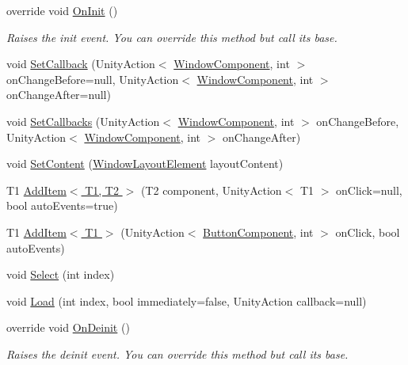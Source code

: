 \begin{DoxyCompactItemize}
\item 
override void \hyperlink{class_unity_engine_1_1_u_i_1_1_windows_1_1_components_1_1_tabs_a09878546b509e7b25a479278f45f5b26}{On\+Init} ()
\begin{DoxyCompactList}\small\item\em Raises the init event. You can override this method but call it\textquotesingle{}s base. \end{DoxyCompactList}\item 
void \hyperlink{class_unity_engine_1_1_u_i_1_1_windows_1_1_components_1_1_tabs_a8402abf2188439aa7919a1f2645fce62}{Set\+Callback} (Unity\+Action$<$ \hyperlink{class_unity_engine_1_1_u_i_1_1_windows_1_1_window_component}{Window\+Component}, int $>$ on\+Change\+Before=null, Unity\+Action$<$ \hyperlink{class_unity_engine_1_1_u_i_1_1_windows_1_1_window_component}{Window\+Component}, int $>$ on\+Change\+After=null)
\item 
void \hyperlink{class_unity_engine_1_1_u_i_1_1_windows_1_1_components_1_1_tabs_a39db1c47ef456cab544eca9007e92973}{Set\+Callbacks} (Unity\+Action$<$ \hyperlink{class_unity_engine_1_1_u_i_1_1_windows_1_1_window_component}{Window\+Component}, int $>$ on\+Change\+Before, Unity\+Action$<$ \hyperlink{class_unity_engine_1_1_u_i_1_1_windows_1_1_window_component}{Window\+Component}, int $>$ on\+Change\+After)
\item 
void \hyperlink{class_unity_engine_1_1_u_i_1_1_windows_1_1_components_1_1_tabs_a76036c768aaaa23bf3e0a929f564b8fb}{Set\+Content} (\hyperlink{class_unity_engine_1_1_u_i_1_1_windows_1_1_window_layout_element}{Window\+Layout\+Element} layout\+Content)
\item 
T1 \hyperlink{class_unity_engine_1_1_u_i_1_1_windows_1_1_components_1_1_tabs_a2bee9df8bfbdc471ad64964342b51ebd}{Add\+Item$<$ T1, T2 $>$} (T2 component, Unity\+Action$<$ T1 $>$ on\+Click=null, bool auto\+Events=true)
\item 
T1 \hyperlink{class_unity_engine_1_1_u_i_1_1_windows_1_1_components_1_1_tabs_ad657e60987ea7455b21ae0dd6fd84e94}{Add\+Item$<$ T1 $>$} (Unity\+Action$<$ \hyperlink{class_unity_engine_1_1_u_i_1_1_windows_1_1_components_1_1_button_component}{Button\+Component}, int $>$ on\+Click, bool auto\+Events)
\item 
void \hyperlink{class_unity_engine_1_1_u_i_1_1_windows_1_1_components_1_1_tabs_a766584f6e14a3af897636378838279cc}{Select} (int index)
\item 
void \hyperlink{class_unity_engine_1_1_u_i_1_1_windows_1_1_components_1_1_tabs_af0281360ad4f03a6bff86d7db13c7c7b}{Load} (int index, bool immediately=false, Unity\+Action callback=null)
\item 
override void \hyperlink{class_unity_engine_1_1_u_i_1_1_windows_1_1_components_1_1_tabs_a12746cec82ef3172a7bdc75683de7389}{On\+Deinit} ()
\begin{DoxyCompactList}\small\item\em Raises the deinit event. You can override this method but call it\textquotesingle{}s base. \end{DoxyCompactList}\end{DoxyCompactItemize}
